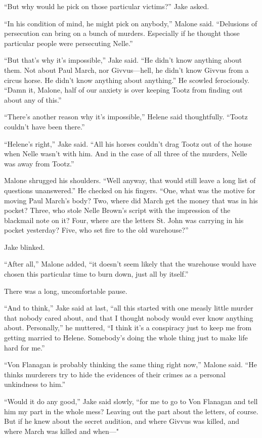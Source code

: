 \documentclass{novel}
\begin{document}
“But why would he pick on those particular victims?” Jake asked.

“In his condition of mind, he might pick on anybody,” Malone said. “Delusions of persecution can bring on a bunch of murders. Especially if he thought those particular people were persecuting Nelle.”

“But that’s why it’s impossible,” Jake said. “He didn’t know anything about them. Not about Paul March, nor Givvus—hell, he didn’t know Givvus from a circus horse. He didn’t know anything about anything.” He scowled ferociously. “Damn it, Malone, half of our anxiety is over keeping Tootz from finding out about any of this.”

“There’s another reason why it’s impossible,” Helene said thoughtfully. “Tootz couldn’t have been there.”

“Helene’s right,” Jake said. “All his horses couldn’t drag Tootz out of the house when Nelle wasn’t with him. And in the case of all three of the murders, Nelle was away from Tootz.”

Malone shrugged his shoulders. “Well anyway, that would still leave a long list of questions unanswered.” He checked on his fingers. “One, what was the motive for moving Paul March’s body? Two, where did March get the money that was in his pocket? Three, who stole Nelle Brown’s script with the impression of the blackmail note on it? Four, where are the letters St. John was carrying in his pocket yesterday? Five, who set fire to the old warehouse?”

Jake blinked.

“After all,” Malone added, “it doesn’t seem likely that the warehouse would have chosen this particular time to burn down, just all by itself.”

There was a long, uncomfortable pause.

“And to think,” Jake said at last, “all this started with one measly little murder that nobody cared about, and that I thought nobody would ever know anything about. Personally,” he muttered, “I think it’s a conspiracy just to keep me from getting married to Helene. Somebody’s doing the whole thing just to make life hard for me.”

“Von Flanagan is probably thinking the same thing right now,” Malone said. “He thinks murderers try to hide the evidences of their crimes as a personal unkindness to him.”

“Would it do any good,” Jake said slowly, “for me to go to Von Flanagan and tell him my part in the whole mess? Leaving out the part about the letters, of course. But if he knew about the secret audition, and where Givvus was killed, and where March was killed and when—"
\end{document}
